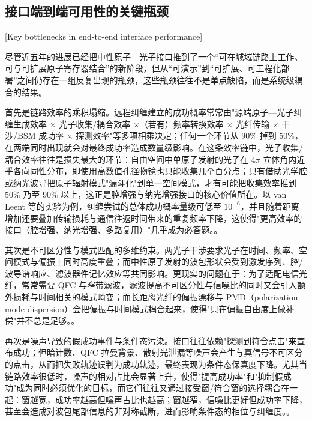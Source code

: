 \subsection{接口端到端可用性的关键瓶颈}[Key bottlenecks in end-to-end interface performance]

尽管近五年的进展已经把中性原子—光子接口推到了一个“可在城域链路上工作、可与可扩展原子寄存器结合”的新阶段，但从“可演示”到“可扩展、可工程化部署”之间仍存在一组反复出现的瓶颈，这些瓶颈往往不是单点缺陷，而是系统级耦合的结果。

首先是链路效率的乘积塌缩。远程纠缠建立的成功概率常常由"源端原子—光子纠缠生成效率 $\times$ 光子收集/耦合效率 $\times$（若有）频率转换效率 $\times$ 光纤传输 $\times$ 干涉/BSM 成功率 $\times$ 探测效率"等多项相乘决定；任何一个环节从 $90\%$ 掉到 $50\%$，在两端同时出现就会对最终成功率造成数量级影响。在这条效率链中，光子收集/耦合效率往往是损失最大的环节：自由空间中单原子发射的光子在 $4\pi$ 立体角内近乎各向同性分布，即使用高数值孔径物镜也只能收集几个百分点；只有借助光学腔或纳光波导把原子辐射模式"漏斗化"到单一空间模式，才有可能把收集效率推到 $50\%$ 乃至 $90\%$ 以上，这正是腔增强与纳光增强接口的核心价值所在。以 van Leent 等的实验为例，纠缠尝试的总体成功概率量级可低至 $10^{-6}$，并且随着距离增加还要叠加传输损耗与通信往返时间带来的重复频率下降，这使得"更高效率的接口（腔增强、纳光增强、多路复用）"几乎成为必答题。\cite{vanleent2022entangling,Hartung2024QuantumNetworkRegisterTweezerCavity}。%

其次是不可区分性与模式匹配的多维约束。两光子干涉要求光子在时间、频率、空间模式与偏振上同时高度重叠；而中性原子发射的波包形状会受到激发序列、腔/波导谱响应、滤波器件记忆效应等共同影响。更现实的问题在于：为了适配电信光纤，常常需要 QFC 与窄带滤波，滤波提高不可区分性与信噪比的同时又会引入额外损耗与时间相关的模式畸变；而长距离光纤的偏振漂移与 PMD（polarization mode dispersion）会把偏振与时间模式耦合起来，使得"只在偏振自由度上做补偿"并不总是足够。\cite{vanleent2022entangling,Zhu2025RemoteQuantumNetworksQuantumMemories}。%

再次是噪声导致的假成功事件与条件态污染。接口往往依赖"探测到符合点击"来宣布成功；但暗计数、QFC 拉曼背景、散射光泄漏等噪声会产生与真信号不可区分的点击，从而把失败轨迹误判为成功轨迹，最终表现为条件态保真度下降。尤其当链路效率很低时，噪声的相对占比会显著上升，使得"提高成功率"和"抑制假成功"成为同时必须优化的目标，而它们往往又通过接受窗/符合窗的选择耦合在一起：窗越宽，成功率越高但噪声占比也越高；窗越窄，信噪比更好但成功率下降，甚至会造成对波包尾部信息的非对称截断，进而影响条件态的相位与纠缠度。\cite{vanleent2022entangling}。%

